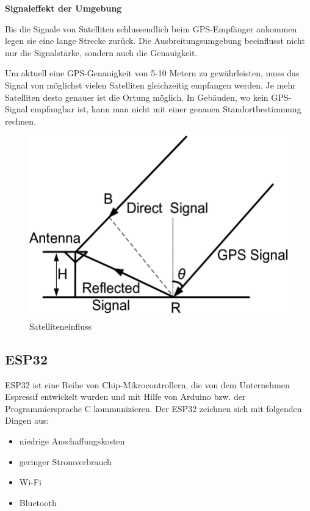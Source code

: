 \textbf{Signaleffekt der Umgebung}


Bis die Signale von Satelliten schlussendlich beim GPS-Empfänger ankommen legen sie eine lange Strecke zurück. Die Ausbreitungsumgebung beeinflusst nicht nur die Signalstärke, sondern auch die Genauigkeit.

Um aktuell eine GPS-Genauigkeit von 5-10 Metern zu gewährleisten, muss das Signal von möglichst vielen Satelliten gleichzeitig empfangen werden. Je mehr Satelliten desto genauer ist die Ortung möglich. In Gebäuden, wo kein GPS-Signal empfangbar ist, kann man nicht mit einer genauen Standortbestimmung rechnen. \parencite{GPSGenauigkeit}

\begin{figure}[H]
	\centering
	\includegraphics[width=0.7\linewidth]{images/Satelliteneinfluss.jpg}
	\caption[Satelliteneinfluss]{Satelliteneinfluss}
	\label{fig:Satelliteneinfluss}
\end{figure}

\subsection{ESP32}

ESP32 ist eine Reihe von Chip-Mikrocontrollern, die von dem Unternehmen Espressif entwickelt wurden und mit Hilfe von Arduino bzw. der Programmiersprache C kommunizieren. Der ESP32 \textcite{ESP32} zeichnen sich mit folgenden Dingen aus:

\begin{itemize}
	\item niedrige Anschaffungskosten
	\item geringer Stromverbrauch
	\item Wi-Fi
	\item Bluetooth
\end{itemize}



